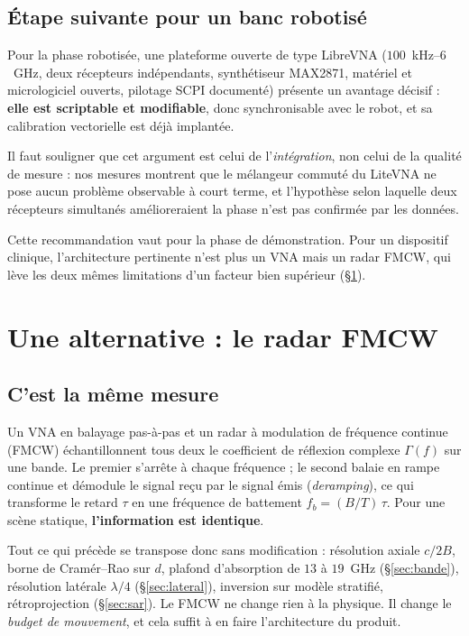 \documentclass[11pt,a4paper]{article}
\begin{document}
\subsection{Étape suivante pour un banc robotisé}

Pour la phase robotisée, une plateforme ouverte de type LibreVNA
($100$~kHz--$6$~GHz, deux récepteurs indépendants, synthétiseur MAX2871,
matériel et micrologiciel ouverts, pilotage SCPI documenté) présente un avantage
décisif : \textbf{elle est scriptable et modifiable}, donc synchronisable avec
le robot, et sa calibration vectorielle est déjà implantée.

Il faut souligner que cet argument est celui de l'\emph{intégration}, non celui
de la qualité de mesure : nos mesures montrent que le mélangeur commuté du
LiteVNA ne pose aucun problème observable à court terme, et l'hypothèse selon
laquelle deux récepteurs simultanés amélioreraient la phase n'est pas confirmée
par les données.

Cette recommandation vaut pour la phase de démonstration. Pour un dispositif
clinique, l'architecture pertinente n'est plus un VNA mais un radar FMCW, qui
lève les deux mêmes limitations d'un facteur bien supérieur
(\S\ref{sec:fmcw}).

\section{Une alternative : le radar FMCW}
\label{sec:fmcw}

\subsection{C'est la même mesure}

Un VNA en balayage pas-à-pas et un radar à modulation de fréquence continue
(FMCW) échantillonnent tous deux le coefficient de réflexion complexe
$\Gamma(f)$ sur une bande. Le premier s'arrête à chaque fréquence ; le second
balaie en rampe continue et démodule le signal reçu par le signal émis
(\emph{deramping}), ce qui transforme le retard $\tau$ en une fréquence de
battement $f_b = (B/T)\,\tau$. Pour une scène statique,
\textbf{l'information est identique}.

Tout ce qui précède se transpose donc sans modification : résolution axiale
$c/2B$, borne de Cramér--Rao sur $d$, plafond d'absorption de $13$ à $19$~GHz
(\S\ref{sec:bande}), résolution latérale $\lambda/4$ (\S\ref{sec:lateral}),
inversion sur modèle stratifié, rétroprojection (\S\ref{sec:sar}). Le FMCW ne
change rien à la physique. Il change le \emph{budget de mouvement}, et cela
suffit à en faire l'architecture du produit.
\end{document}
